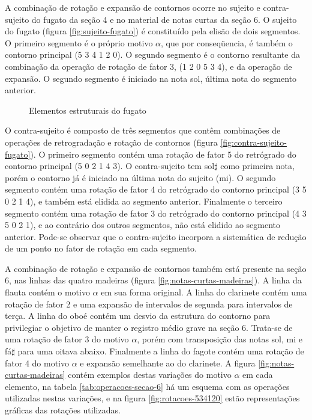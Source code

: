 A combinação de rotação e expansão de contornos ocorre no sujeito e
contra-sujeito do fugato da seção 4 e no material de notas curtas da
seção 6. O sujeito do fugato (figura \ref{fig:sujeito-fugato}) é
constituído pela elisão de dois segmentos. O primeiro segmento é o
próprio motivo $\alpha$, que por conseqüencia, é também o contorno
principal (5 3 4 1 2 0). O segundo segmento é o contorno resultante da
combinação da operação de rotação de fator 3, (1 2 0 5 3 4), e da
operação de expansão. O segundo segmento é iniciado na nota sol,
última nota do segmento anterior.

\begin{figure}
  \centering

  \caption{Elementos estruturais do fugato}
  \label{fig:elementos-fugato}
\end{figure}

O contra-sujeito é composto de três segmentos que contêm combinações
de operações de retrogradação e rotação de contornos (figura
\ref{fig:contra-sujeito-fugato}). O primeiro segmento contém uma
rotação de fator 5 do retrógrado do contorno principal (5 0 2 1 4 3).
O contra-sujeito tem sol$\sharp$ como primeira nota, porém o contorno
já é iniciado na última nota do sujeito (mi). O segundo segmento
contém uma rotação de fator 4 do retrógrado do contorno principal (3 5
0 2 1 4), e também está elidida ao segmento anterior. Finalmente o
terceiro segmento contém uma rotação de fator 3 do retrógrado do
contorno principal (4 3 5 0 2 1), e ao contrário dos outros segmentos,
não está elidido ao segmento anterior. Pode-se observar que o
contra-sujeito incorpora a sistemática de redução de um ponto no fator
de rotação em cada segmento.

A combinação de rotação e expansão de contornos também está presente
na seção 6, nas linhas das quatro madeiras (figura
\ref{fig:notas-curtas-madeiras}). A linha da flauta contém o motivo
$\alpha$ em sua forma original. A linha do clarinete contém uma
rotação de fator 2 e uma expansão de intervalos de segunda para
intervalos de terça. A linha do oboé contém um desvio da estrutura do
contorno para privilegiar o objetivo de manter o registro médio grave
na seção 6. Trata-se de uma rotação de fator 3 do motivo $\alpha$,
porém com transposição das notas sol, mi e fá$\sharp$ para uma oitava
abaixo. Finalmente a linha do fagote contém uma rotação de fator 4 do
motivo $\alpha$ e expansão semelhante ao do clarinete. A figura
\ref{fig:notas-curtas-madeiras} contém exemplos destas variações do
motivo $\alpha$ em cada elemento, na tabela
\ref{tab:operacoes-secao-6} há um esquema com as operações utilizadas
nestas variações, e na figura \ref{fig:rotacoes-534120} estão
representações gráficas das rotações utilizadas.

